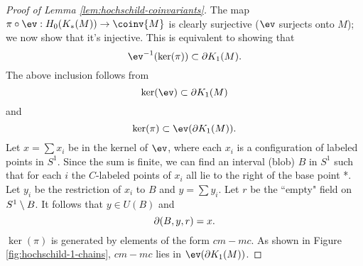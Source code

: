 \begin{proof}[Proof of Lemma \ref{lem:hochschild-coinvariants}]
The map $\pi \compose \ev: H_0(K_*(M)) \to \coinv{M}$ is clearly 
surjective ($\ev$ surjects onto $M$); we now show that it's injective.
This is equivalent to showing that 
\[
	\ev\inv(\ker(\pi)) \sub \bd K_1(M) .
\]
The above inclusion follows from
\[
	\ker(\ev) \sub \bd K_1(M)
\]
and
\[
	\ker(\pi) \sub \ev(\bd K_1(M)) .
\]
Let $x = \sum x_i$ be in the kernel of $\ev$, where each $x_i$ is a configuration of 
labeled points in $S^1$.
Since the sum is finite, we can find an interval (blob) $B$ in $S^1$
such that for each $i$ the $C$-labeled points of $x_i$ all lie to the right of the 
base point *.
Let $y_i$ be the restriction of $x_i$ to $B$ and $y = \sum y_i$.
Let $r$ be the ``empty" field on $S^1 \setminus B$.
It follows that $y \in U(B)$ and 
\[
	\partial(B, y, r) = x .
\]
$\ker(\pi)$ is generated by elements of the form $cm - mc$.
As shown in Figure \ref{fig:hochschild-1-chains}, $cm - mc$ lies in $\ev(\bd K_1(M))$.
\end{proof}


